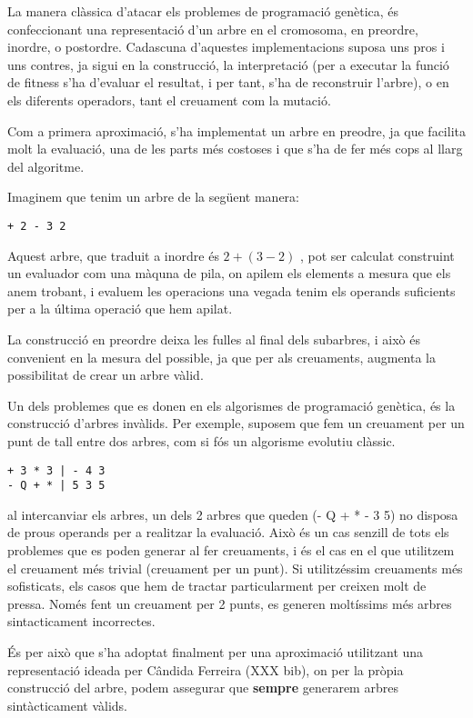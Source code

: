 \documentclass[titlepage,a4paper,12pt]{book}
\begin{document}
La manera clàssica d'atacar els problemes de programació genètica, és
confeccionant una representació d'un arbre en el cromosoma, en preordre,
inordre, o postordre.  Cadascuna d'aquestes implementacions suposa uns pros i
uns contres, ja sigui en la construcció, la interpretació (per a executar la
funció de fitness s'ha d'evaluar el resultat, i per tant, s'ha de reconstruir
l'arbre), o en els diferents operadors, tant el creuament com la mutació.

Com a primera aproximació, s'ha implementat un arbre en preodre, ja que facilita
molt la evaluació, una de les parts més costoses i que s'ha de fer més cops al
llarg del algoritme.

Imaginem que tenim un arbre de la següent manera:

\begin{verbatim}
+ 2 - 3 2
\end{verbatim}

Aquest arbre, que traduit a inordre és $ 2 + (3 -2) $ , pot ser calculat
construint un evaluador com una màquna de pila, on apilem els elements a mesura
que els anem trobant, i evaluem les operacions una vegada tenim els operands
suficients per a la última operació que hem apilat.

La construcció en preordre deixa les fulles al final dels subarbres, i això és
convenient en la mesura del possible, ja que per als creuaments, augmenta la
possibilitat de crear un arbre vàlid. %

Un dels problemes que es donen en els algorismes de programació genètica, és la
construcció d'arbres invàlids. Per exemple, suposem que fem un creuament per un
punt de tall entre dos arbres, com si fós un algorisme evolutiu clàssic.

\begin{verbatim}
+ 3 * 3 | - 4 3
- Q + * | 5 3 5
\end{verbatim}

al intercanviar els arbres, un dels 2 arbres que queden (- Q + * - 3 5) no
disposa de prous operands per a realitzar la evaluació.  Això és un cas senzill
de tots els problemes que es poden generar al fer creuaments, i és el cas en el
que utilitzem el creuament més trivial (creuament per un punt). Si utilitzéssim
creuaments més sofisticats, els casos que hem de tractar particularment per
creixen molt de pressa.  Només fent un creuament per 2 punts, es generen
moltíssims més arbres sintacticament incorrectes.

És per això que s'ha adoptat finalment per una aproximació utilitzant una
representació ideada per Cândida Ferreira (XXX bib), on per la pròpia construcció del
arbre, podem assegurar que \textbf{sempre} generarem arbres sintàcticament
vàlids.
\end{document}
